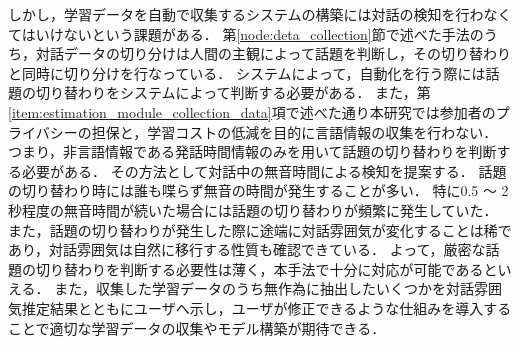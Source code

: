 しかし，学習データを自動で収集するシステムの構築には対話の検知を行わなくてはいけないという課題がある．
第\ref{node:deta_collection}節で述べた手法のうち，対話データの切り分けは人間の主観によって話題を判断し，その切り替わりと同時に切り分けを行なっている．
システムによって，自動化を行う際には話題の切り替わりをシステムによって判断する必要がある．
また，第\ref{item:estimation_module_collection_data}項で述べた通り本研究では参加者のプライバシーの担保と，学習コストの低減を目的に言語情報の収集を行わない．
つまり，非言語情報である発話時間情報のみを用いて話題の切り替わりを判断する必要がある．
その方法として対話中の無音時間による検知を提案する．
話題の切り替わり時には誰も喋らず無音の時間が発生することが多い．
特に0.5 〜 2秒程度の無音時間が続いた場合には話題の切り替わりが頻繁に発生していた．
また，話題の切り替わりが発生した際に途端に対話雰囲気が変化することは稀であり，対話雰囲気は自然に移行する性質も確認できている．
よって，厳密な話題の切り替わりを判断する必要性は薄く，本手法で十分に対応が可能であるといえる．
また，収集した学習データのうち無作為に抽出したいくつかを対話雰囲気推定結果とともにユーザへ示し，ユーザが修正できるような仕組みを導入することで適切な学習データの収集やモデル構築が期待できる．
